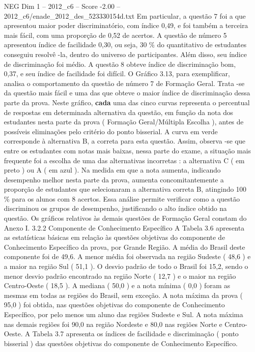 \begin{textsample}{NEG Dim 1 – 2012\_c6 – Score -2.00 – 2012\_c6/enade\_2012\_des\_523330154d.txt}
Em particular, a questão 7 foi a que apresentou maior poder discriminatório, com índice 0,49, e foi também a terceira mais fácil, com uma proporção de 0,52 de acertos.
A questão de número 5 apresentou índice de facilidade 0,30, ou seja, 30 \% do quantitativo de estudantes conseguiu resolvê -la, dentro do universo de participantes.
Além disso, seu índice de discriminação foi médio.
A questão 8 obteve índice de discriminação bom, 0,37, e seu índice de facilidade foi difícil.
O Gráfico 3.13, para exemplificar, analisa o comportamento da questão de número 7 de Formação Geral.
Trata -se da questão mais fácil e uma das que obteve o maior índice de discriminação dessa parte da prova.
Neste gráfico, \textbf{cada} uma das cinco curvas representa o percentual de respostas em determinada alternativa da questão, em função da nota dos estudantes nesta parte da prova ( Formação Geral/Múltipla Escolha ), antes de possíveis eliminações pelo critério do ponto bisserial.
A curva em verde corresponde à alternativa B, a correta para esta questão.
Assim, observa -se que entre os estudantes com notas mais baixas, nessa parte do exame, a situação mais frequente foi a escolha de uma das alternativas incorretas : a alternativa C ( em preto ) ou A ( em azul ).
Na medida em que a nota aumenta, indicando desempenho melhor nesta parte da prova, aumenta concomitantemente a proporção de estudantes que selecionaram a alternativa correta B, atingindo 100 \% para os alunos com 8 acertos.
Essa análise permite verificar como a questão discriminou os grupos de desempenho, justificando o alto índice obtido na questão.
Os gráficos relativos às demais questões de Formação Geral constam do Anexo I. 3.2.2 Componente de Conhecimento Específico A Tabela 3.6 apresenta as estatísticas básicas em relação às questões objetivas do componente de Conhecimento Específico da prova, por Grande Região.
A média do Brasil deste componente foi de 49,6.
A menor média foi observada na região Sudeste ( 48,6 ) e a maior na região Sul ( 51,1 ).
O desvio padrão de todo o Brasil foi 15,2, sendo o menor desvio padrão encontrado na região Norte ( 12,7 ) e o maior na região Centro-Oeste ( 18,5 ).
A mediana ( 50,0 ) e a nota mínima ( 0,0 ) foram as mesmas em todas as regiões do Brasil, sem exceção.
A nota máxima da prova ( 95,0 ) foi obtida, nas questões objetivas do componente de Conhecimento Específico, por pelo menos um aluno das regiões Sudeste e Sul.
A nota máxima nas demais regiões foi 90,0 na região Nordeste e 80,0 nas regiões Norte e Centro-Oeste.
A Tabela 3.7 apresenta os índices de facilidade e discriminação ( ponto bisserial ) das questões objetivas do componente de Conhecimento Específico.

\end{textsample}
